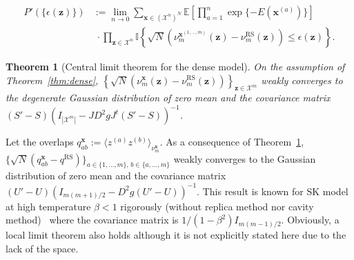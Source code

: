 \documentclass[conference,twocolumns]{IEEEtran}
\theoremstyle{plain}
\newtheorem{theorem}{Theorem}
\begin{document}
\begin{align*}
P'(\{\epsilon(\bm{z})\}) &:=\lim_{n\to 0}\sum_{\bm{x}\in(\mathcal{X}^n)^N}\mathbb{E}\left[\prod_{a=1}^n\exp\{-E(\bm{x}^{(a)})\}\right]\nonumber\\
&\;\cdot \prod_{\bm{z}\in\mathcal{X}^n}\mathbb{I}\left\{\sqrt{N}(\nu_m^{\bm{x}^{(1,\dotsc,m)}}(\bm{z})- \nu_m^{\mathrm{RS}}(\bm{z}))\le\epsilon(\bm{z})\right\}.
\end{align*}
\begin{theorem}[Central limit theorem for the dense model]\label{thm:Gauss}
On the assumption of Theorem~\ref{thm:dense},
$\left\{\sqrt{N}\left(\nu_m^{\bm{x}}(\bm{z})-\nu_m^{\mathrm{RS}}(\bm{z})\right)\right\}_{\bm{z}\in\mathcal{X}^m}$
 weakly converges to the degenerate Gaussian distribution of zero mean and
the covariance matrix $(S'-S)(I_{|\mathcal{X}^m|}-JD^2gJ^t(S'-S))^{-1}$.
\end{theorem}
Let the overlaps $q_{ab}^{\bm{x}}:=\langle z^{(a)}z^{(b)}\rangle_{\nu_m^{\bm{x}}}$.
As a consequence of Theorem~\ref{thm:Gauss},
$\{\sqrt{N}(q^{\bm{x}}_{ab}-q^{\mathrm{RS}})\}_{a\in\{1,\dotsc,m\},\,b\in\{a,\dotsc,m\}}$ weakly converges to the Gaussian distribution of zero mean and
the covariance matrix $(U'-U)\left(I_{m(m+1)/2} -D^2g(U'-U)\right)^{-1}$.
This result is known for SK model at high temperature $\beta<1$ rigorously (without replica method nor cavity method)~\cite{comets1995sherrington}
where the covariance matrix is $1/(1-\beta^2) I_{m(m-1)/2}$.
Obviously, a local limit theorem also holds although it is not explicitly stated here due to the lack of the space.
\end{document}
